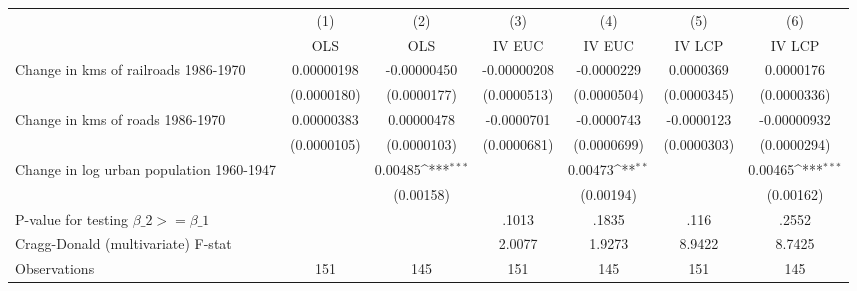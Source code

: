 {
\def\sym#1{\ifmmode^{#1}\else\(^{#1}\)\fi}
\begin{tabular}{l*{6}{c}}
\hline\hline
                &\multicolumn{1}{c}{(1)}&\multicolumn{1}{c}{(2)}&\multicolumn{1}{c}{(3)}&\multicolumn{1}{c}{(4)}&\multicolumn{1}{c}{(5)}&\multicolumn{1}{c}{(6)}\\
                &\multicolumn{1}{c}{OLS}&\multicolumn{1}{c}{OLS}&\multicolumn{1}{c}{IV EUC}&\multicolumn{1}{c}{IV EUC}&\multicolumn{1}{c}{IV LCP}&\multicolumn{1}{c}{IV LCP}\\
\hline
Change in kms of railroads 1986-1970&0.00000198         &-0.00000450         &-0.00000208         &-0.0000229         &0.0000369         &0.0000176         \\
                &(0.0000180)         &(0.0000177)         &(0.0000513)         &(0.0000504)         &(0.0000345)         &(0.0000336)         \\
[1em]
Change in kms of roads 1986-1970&0.00000383         &0.00000478         &-0.0000701         &-0.0000743         &-0.0000123         &-0.00000932         \\
                &(0.0000105)         &(0.0000103)         &(0.0000681)         &(0.0000699)         &(0.0000303)         &(0.0000294)         \\
[1em]
Change in log urban population 1960-1947&                  &  0.00485\sym{***}&                  &  0.00473\sym{**} &                  &  0.00465\sym{***}\\
                &                  &(0.00158)         &                  &(0.00194)         &                  &(0.00162)         \\
\hline
P-value for testing $\beta\_{2} >= \beta\_{1}$&                  &                  &    .1013         &    .1835         &     .116         &    .2552         \\
Cragg-Donald (multivariate) F-stat&                  &                  &   2.0077         &   1.9273         &   8.9422         &   8.7425         \\
Observations    &      151         &      145         &      151         &      145         &      151         &      145         \\
\hline\hline
\end{tabular}
}
